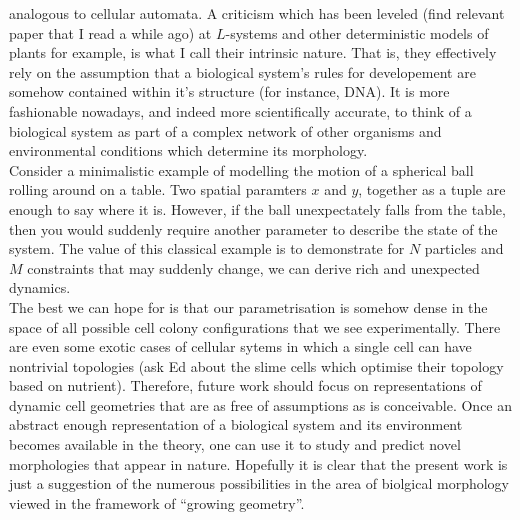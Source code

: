 analogous to cellular automata. A criticism which has been leveled 
(find relevant paper that I read a while ago) at $L$-systems and other deterministic models
of plants for example, is what I call their intrinsic nature. That is, they effectively
rely on the assumption that a biological system's rules for developement are somehow contained
within it's structure (for instance, DNA). It is more fashionable nowadays, and indeed more 
scientifically accurate, to think of a biological system as part of a complex network 
of other organisms and environmental conditions which determine its morphology.
\\
Consider a minimalistic example of modelling the motion of a spherical ball rolling around on a table.
Two spatial paramters $x$ and $y$, together as a tuple are enough to say where it is. However, 
if the ball unexpectately falls from the table, then you would suddenly require
another parameter to describe the state of the system. The value of this classical example
is to demonstrate for $N$ particles and $M$ constraints that may suddenly change, 
we can derive rich and unexpected dynamics.
\\
The best we can hope for is that our parametrisation is somehow dense in the space
of all possible cell colony configurations that we see experimentally. There are even
some exotic cases of cellular sytems in which a single cell can have nontrivial topologies (ask Ed 
about the slime cells which optimise their topology based on nutrient). Therefore, future work 
should focus on representations of dynamic cell geometries that are as free of assumptions as
is conceivable. Once an abstract enough representation of a biological system and its environment
becomes available in the theory, one can use it to study and predict novel morphologies that appear 
in nature. Hopefully it is clear that the present work is just a suggestion of the numerous possibilities
in the area of biolgical morphology viewed in the framework of ``growing geometry''.


